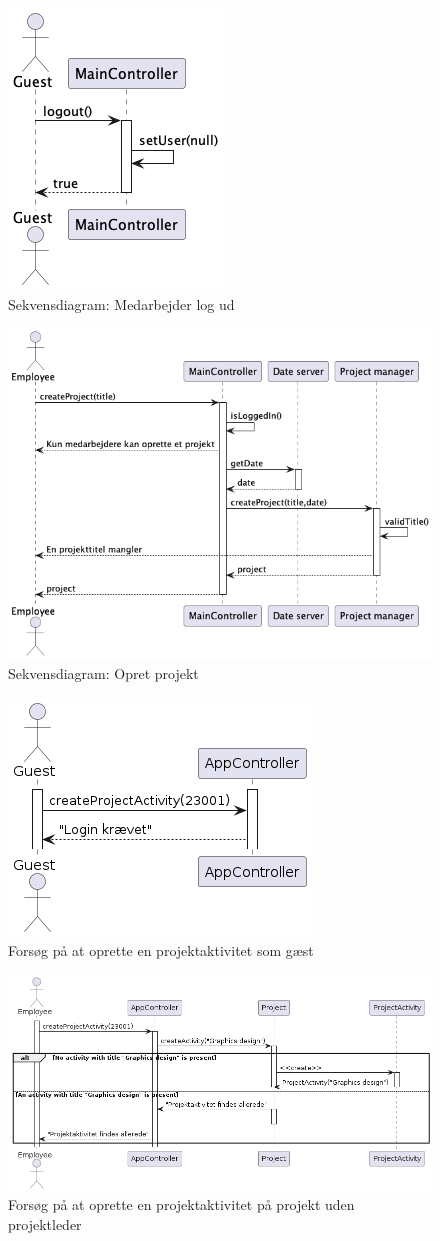 \begin{figure}[H]
    \centering
    \caption{Sekvensdiagram: Medarbejder log ud}\label{fig:sequence_logout}
    \includegraphics[width = .25\textwidth]{Diagrams/seq_logout.png}
\end{figure}
\begin{figure}[H]
    \centering
    \caption{Sekvensdiagram: Opret projekt}\label{fig:sequence_create_project}
    \includegraphics[width = .75\textwidth]{Diagrams/seq_create_project.png}
\end{figure}
\begin{figure}[H]
    \centering
    \caption{Forsøg på at oprette en projektaktivitet som gæst}\label{fig:sequence_create_PA_guest}
    \includegraphics[width = .35\textwidth]{RequirementsAndDesign/Diagrams/createActivityNoPLGuest.png}
\end{figure}
\begin{figure}[H]
    \centering
    \caption{Forsøg på at oprette en projektaktivitet på projekt uden projektleder}\label{fig:sequence_create_PA_no_PL_1}
    \includegraphics[width = .75\textwidth]{RequirementsAndDesign/Diagrams/createActivityNoPLCase1.png}
\end{figure}
